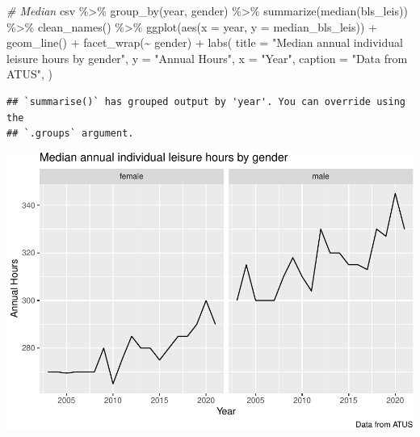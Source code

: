 \documentclass[
]{article}
\newenvironment{Shaded}{\begin{snugshade}}{\end{snugshade}}
\newcommand{\AttributeTok}[1]{\textcolor[rgb]{0.77,0.63,0.00}{#1}}
\newcommand{\CommentTok}[1]{\textcolor[rgb]{0.56,0.35,0.01}{\textit{#1}}}
\newcommand{\FunctionTok}[1]{\textcolor[rgb]{0.00,0.00,0.00}{#1}}
\newcommand{\NormalTok}[1]{#1}
\newcommand{\SpecialCharTok}[1]{\textcolor[rgb]{0.00,0.00,0.00}{#1}}
\newcommand{\StringTok}[1]{\textcolor[rgb]{0.31,0.60,0.02}{#1}}
\begin{document}
\begin{Shaded}
\begin{Highlighting}[]
\CommentTok{\# Median}
\NormalTok{csv }\SpecialCharTok{\%\textgreater{}\%}
  \FunctionTok{group\_by}\NormalTok{(year, gender) }\SpecialCharTok{\%\textgreater{}\%}
  \FunctionTok{summarize}\NormalTok{(}\FunctionTok{median}\NormalTok{(bls\_leis)) }\SpecialCharTok{\%\textgreater{}\%}
  \FunctionTok{clean\_names}\NormalTok{() }\SpecialCharTok{\%\textgreater{}\%}
  \FunctionTok{ggplot}\NormalTok{(}\FunctionTok{aes}\NormalTok{(}\AttributeTok{x =}\NormalTok{ year, }\AttributeTok{y =}\NormalTok{ median\_bls\_leis)) }\SpecialCharTok{+}
  \FunctionTok{geom\_line}\NormalTok{() }\SpecialCharTok{+}
  \FunctionTok{facet\_wrap}\NormalTok{(}\SpecialCharTok{\textasciitilde{}}\NormalTok{ gender) }\SpecialCharTok{+}
  \FunctionTok{labs}\NormalTok{(}
  \AttributeTok{title =} \StringTok{"Median annual individual leisure hours by gender"}\NormalTok{,}
  \AttributeTok{y =} \StringTok{"Annual Hours"}\NormalTok{,}
  \AttributeTok{x =} \StringTok{"Year"}\NormalTok{,}
  \AttributeTok{caption =} \StringTok{"Data from ATUS"}\NormalTok{,}
\NormalTok{) }
\end{Highlighting}
\end{Shaded}

\begin{verbatim}
## `summarise()` has grouped output by 'year'. You can override using the
## `.groups` argument.
\end{verbatim}

\includegraphics{Paper2_files/figure-latex/graphs-5.pdf}
\end{document}
